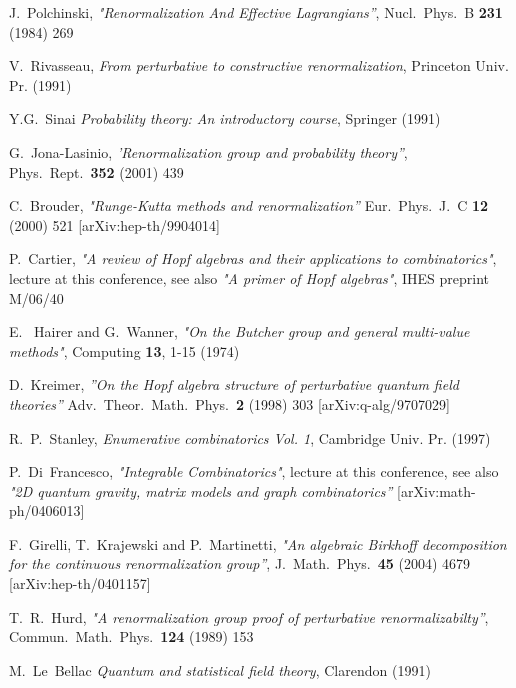 \documentclass[10pt,here,feynmf]{article}
\begin{document}
\begin{thebibliography}{99}
J.~Polchinski,
  {\it "Renormalization And Effective Lagrangians''}, 
  Nucl.\ Phys.\  B {\bf 231} (1984) 269


  V.~Rivasseau,
  {\it From perturbative to constructive renormalization},
  Princeton Univ. Pr. (1991) 


Y.G.~Sinai {\it Probability theory: An introductory course}, Springer (1991)

G.~Jona-Lasinio,
  {\it 'Renormalization group and probability theory''},
  Phys.\ Rept.\  {\bf 352} (2001) 439
  
  
  
   C.~Brouder,
  {\it "Runge-Kutta methods and renormalization''}
  Eur.\ Phys.\ J.\  C {\bf 12} (2000) 521
  [arXiv:hep-th/9904014]

P.~Cartier,  {\it "A review of Hopf algebras and their applications to combinatorics"}, lecture at this conference, see also {\it "A primer of Hopf algebras"}, IHES preprint M/06/40

E.~ Hairer and G.~Wanner, {\it "On the Butcher group and general multi-value methods"}, Computing {\bf
13}, 1-15 (1974)

  D.~Kreimer,
  {\it ''On the Hopf algebra structure of perturbative quantum field theories''}
  Adv.\ Theor.\ Math.\ Phys.\  {\bf 2} (1998) 303
  [arXiv:q-alg/9707029]

R.~P.~Stanley, {\it Enumerative combinatorics Vol. 1},  Cambridge Univ. Pr.  (1997)


P.~Di~Francesco, {\it "Integrable Combinatorics"}, lecture at this conference, see also {\it "2D quantum gravity, matrix models and graph combinatorics''} [arXiv:math-ph/0406013]



  F.~Girelli, T.~Krajewski and P.~Martinetti,
  {\it "An algebraic Birkhoff decomposition for the continuous renormalization group''},
  J.\ Math.\ Phys.\  {\bf 45} (2004) 4679
  [arXiv:hep-th/0401157]


T.~R.~Hurd,
  {\it "A renormalization group proof of perturbative renormalizabilty''},
  Commun.\ Math.\ Phys.\  {\bf 124} (1989) 153





M.~Le~Bellac {\it Quantum and statistical field theory}, Clarendon (1991)



\end{thebibliography}
\end{document}
